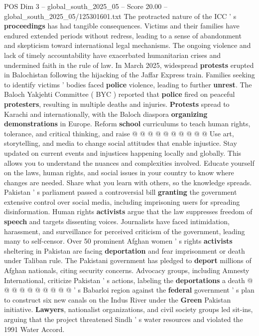 \begin{textsample}{POS Dim 3 – global\_south\_2025\_05 – Score 20.00 – global\_south\_2025\_05/125301601.txt}
The protracted nature of the ICC ' s \textbf{proceedings} has had tangible consequences.
Victims and their families have endured extended periods without redress, leading to a sense of abandonment and skepticism toward international legal mechanisms.
The ongoing violence and lack of timely accountability have exacerbated humanitarian crises and undermined faith in the rule of law.
In March 2025, widespread \textbf{protests} erupted in Balochistan following the hijacking of the Jaffar Express train.
Families seeking to identify victims ' bodies faced \textbf{police} violence, leading to further \textbf{unrest}.
The Baloch Yakjehti Committee ( BYC ) reported that \textbf{police} fired on peaceful \textbf{protesters}, resulting in multiple deaths and injuries. \textbf{Protests} spread to Karachi and internationally, with the Baloch diaspora \textbf{organizing} \textbf{demonstrations} in Europe.
Reform \textbf{school} curriculums to teach human rights, tolerance, and critical thinking, and raise @ @ @ @ @ @ @ @ @ @ Use art, storytelling, and media to change social attitudes that enable injustice.
Stay updated on current events and injustices happening locally and globally.
This allows you to understand the nuances and complexities involved.
Educate yourself on the laws, human rights, and social issues in your country to know where changes are needed.
Share what you learn with others, so the knowledge spreads.
Pakistan ' s parliament passed a controversial bill \textbf{granting} the government extensive control over social media, including imprisoning users for spreading disinformation.
Human rights \textbf{activists} argue that the law suppresses freedom of \textbf{speech} and targets dissenting voices.
Journalists have faced intimidation, harassment, and surveillance for perceived criticism of the government, leading many to self-censor.
Over 50 prominent Afghan women ' s rights \textbf{activists} sheltering in Pakistan are facing \textbf{deportation} and fear imprisonment or death under Taliban rule.
The Pakistani government has pledged to \textbf{deport} millions of Afghan nationals, citing security concerns.
Advocacy groups, including Amnesty International, criticize Pakistan ' s actions, labeling the \textbf{deportations} a death @ @ @ @ @ @ @ @ @ @ ' s Babarloi region against the \textbf{federal} government ' s plan to construct six new canals on the Indus River under the \textbf{Green} Pakistan initiative. \textbf{Lawyers}, nationalist organizations, and civil society groups led sit-ins, arguing that the project threatened Sindh ' s water resources and violated the 1991 Water Accord.

\end{textsample}
